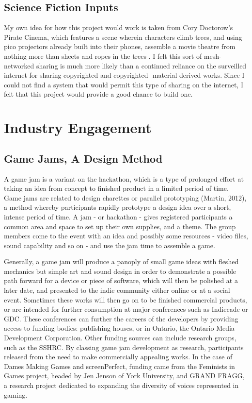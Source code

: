 \subsection{Science Fiction Inputs}
My own idea for how this project would work is taken from Cory Doctorow's Pirate Cinema, which features a scene wherein characters climb trees, and using pico projectors already built into their phones, assemble a movie theatre from nothing more than sheets and ropes in the trees \parencite{doctorow}. I felt this sort of mesh-networked sharing is much more likely than a continued reliance on the surveilled internet for sharing copyrighted and copyrighted- material derived works. Since I could not find a system that would permit this type of sharing on the internet, I felt that this project would provide a good chance to build one.
 
\section{Industry Engagement}
\subsection{Game Jams, A Design Method}
A game jam is a variant on the hackathon, which is a type of prolonged effort at taking an idea from concept to finished product in a limited period of time. Game jams are related to design charettes or parallel prototyping \parencite{martin}(Martin, 2012), a method whereby participants rapidly prototype a design idea over a short, intense period of time. A jam - or hackathon - gives registered participants a common area and space to set up their own supplies, and a theme. The group members come to the event with an idea and possibly some resources - video files, sound capability and so on - and use the jam time to assemble a game.

Generally, a game jam will produce a panoply of small game ideas with fleshed mechanics but simple art and sound design in order to demonstrate a possible path forward for a device or piece of software, which will then be polished at a later date, and presented to the indie community either online or at a social event. Sometimes these works will then go on to be finished commercial products, or are intended for further consumption at major conferences such as Indiecade or GDC. These conferences can further the careers of the developers by providing access to funding bodies: publishing houses, or in Ontario, the Ontario Media Development Corporation. Other funding sources can include research groups, such as the SSHRC. By classing game jam development as research, participants released from the need to make commercially appealing works. In the case of Dames Making Games and screenPerfect, funding came from the Feminists in Games project, headed by Jen Jenson of York University, and GRAND FRAGG, a research project dedicated to expanding the diversity of voices represented in gaming. 

